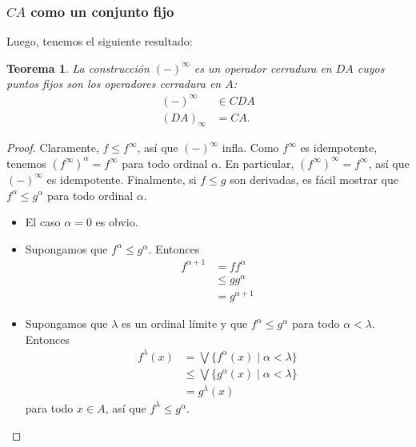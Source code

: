 \documentclass[12pt,letterpaper,titlepage]{article}
\newtheorem{thm}{Teorema}
\theoremstyle{definition}
\newcommand\Sup{\bigvee}
\newcommand\tps[2]{\texorpdfstring{#1}{#2}}
\newcommand\<{\langle}
\renewcommand\>{\rangle}
\begin{document}
\subsubsection{\tps{$CA$}{CA} como un conjunto fijo}
Luego, tenemos el siguiente resultado:
\begin{thm}
    La construcción $({-})^\infty$ es un operador cerradura en $DA$
    cuyos puntos fijos son los operadores cerradura en $A$:
    \begin{align*}
      ({-})^\infty &\in CDA \\
      (DA)_\infty &= CA.
    \end{align*}
\end{thm}
\begin{proof}
    Claramente, $f\leq f^\infty$, así que $(-)^\infty$ infla.
    Como $f^\infty$ es idempotente, tenemos $(f^\infty)^\alpha=f^\infty$
    para todo ordinal $\alpha$.
    En particular, $(f^\infty)^\infty=f^\infty$, así que
    $(-)^\infty$ es idempotente.
    Finalmente, si $f\leq g$ son derivadas, es fácil mostrar que
    $f^\alpha\leq g^\alpha$ para todo ordinal $\alpha$.
    \begin{itemize}
        \item El caso $\alpha=0$ es obvio.
        \item Supongamos que $f^\alpha\leq g^\alpha$.
        Entonces
        \begin{align*}
            f^{\alpha+1}
            &= ff^\alpha \\
            &\leq gg^\alpha \\
            &= g^{\alpha+1}
        \end{align*}
        \item Supongamos que $\lambda$ es un ordinal límite y que
        $f^\alpha\leq g^\alpha$ para todo $\alpha<\lambda$.
        Entonces
        \begin{align*}
            f^\lambda(x)
            &= \Sup\{f^\alpha(x)\mid \alpha<\lambda\} \\
            &\leq \Sup\{g^\alpha(x) \mid \alpha<\lambda\} \\
            &= g^\lambda(x)
        \end{align*}
        para todo $x\in A$, así que $f^\lambda\leq g^\alpha$.
    \end{itemize}
\end{proof}

\end{document}
